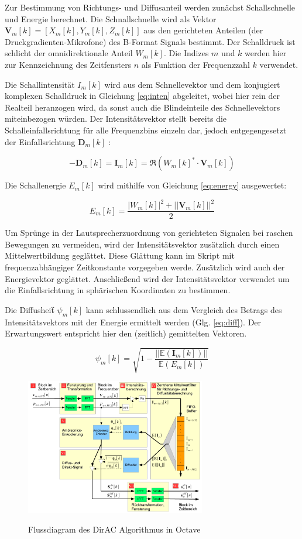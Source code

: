Zur Bestimmung von Richtungs- und Diffusanteil werden zunächst Schallschnelle und Energie berechnet. Die Schnallschnelle wird als Vektor $\textbf{V}_{m}[k] = [X_{m}[k], Y_{m}[k], Z_{m}[k]]$ aus den gerichteten Anteilen (der Druckgradienten-Mikrofone) des B-Format Signals bestimmt. Der Schalldruck ist schlicht der omnidirektionale Anteil $W_{m}[k]$. Die Indizes $m$ und $k$ werden hier zur Kennzeichnung des Zeitfensters $n$ als Funktion der Frequenzzahl $k$ verwendet.

Die Schallintensität $I_{m}[k]$ wird aus dem Schnellevektor und dem konjugiert komplexen Schalldruck in Gleichung \ref{eq:inten} abgeleitet, wobei hier rein der Realteil heranzogen wird, da sonst auch die Blindeinteile des Schnellevektors miteinbezogen würden. Der Intensitätsvektor stellt bereits die Schalleinfallsrichtung für alle Frequenzbins einzeln dar, jedoch entgegengesetzt der Einfallsrichtung $\textbf{D}_{m}[k]$ :

\begin{equation}
    -\textbf{D}_{m}[k] = \textbf{I}_{m}[k] = \Re(W_{m}[k]^{*} \cdot \textbf{V}_{m}[k])
    \label{eq:inten}
\end{equation}

Die Schallenergie $E_{m}[k]$ wird mithilfe von Gleichung \ref{eq:energy} ausgewertet:

\begin{equation}
    E_{m}[k] = \frac{|W_{m}[k]|^2+||\textbf{V}_{m}[k]||^2}{2}
    \label{eq:energy}
\end{equation}

Um Sprünge in der Lautsprecherzuordnung von gerichteten Signalen bei raschen Bewegungen zu vermeiden, wird der Intensitätsvektor zusätzlich durch einen Mittelwertbildung geglättet. Diese Glättung kann im Skript mit frequenzabhängiger Zeitkonstante vorgegeben werde. Zusätzlich wird auch der Energievektor geglättet. Anschließend wird der Intensitätsvektor verwendet um die Einfallsrichtung in sphärischen Koordinaten zu bestimmen.

Die \"Diffusheit\" $\psi_{m}[k]$ kann schlussendlich aus dem Vergleich des Betrags des Intensitätsvektors mit der Energie ermittelt werden (Glg. \ref{eq:diff}). Der Erwartungswert entspricht hier den (zeitlich) gemittelten Vektoren.

\begin{equation}
    \psi_{m}[k] = \sqrt{1 - \frac{||\mathbb{E}(\textbf{I}_{m}[k])||}{\mathbb{E}(E_{m}[k])}}
    \label{eq:diff}
\end{equation}

\begin{figure}[!ht]
  \centering
  \includegraphics[width=0.7\textwidth]{implementierung/plots/flow.png}
  \label{fig:flow}
  \caption{Flussdiagram des DirAC Algorithmus in Octave}
\end{figure}

